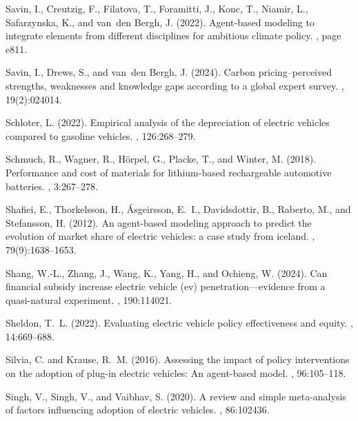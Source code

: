 \documentclass[12pt]{article}
\begin{document}
\begin{thebibliography}{}
Savin, I., Creutzig, F., Filatova, T., Foramitti, J., Konc, T., Niamir, L.,
  Safarzynska, K., and van~den Bergh, J. (2022).
\newblock Agent-based modeling to integrate elements from different disciplines
  for ambitious climate policy.
, page e811.

Savin, I., Drews, S., and van~den Bergh, J. (2024).
\newblock Carbon pricing--perceived strengths, weaknesses and knowledge gaps
  according to a global expert survey.
, 19(2):024014.

Schloter, L. (2022).
\newblock Empirical analysis of the depreciation of electric vehicles compared
  to gasoline vehicles.
, 126:268--279.

Schmuch, R., Wagner, R., H\"{o}rpel, G., Placke, T., and Winter, M. (2018).
\newblock Performance and cost of materials for lithium-based rechargeable
  automotive batteries.
, 3:267--278.

Shafiei, E., Thorkelsson, H., Ásgeirsson, E.~I., Davidsdottir, B., Raberto,
  M., and Stefansson, H. (2012).
\newblock An agent-based modeling approach to predict the evolution of market
  share of electric vehicles: a case study from iceland.
, 79(9):1638--1653.

Shang, W.-L., Zhang, J., Wang, K., Yang, H., and Ochieng, W. (2024).
\newblock Can financial subsidy increase electric vehicle (ev)
  penetration---evidence from a quasi-natural experiment.
, 190:114021.

Sheldon, T.~L. (2022).
\newblock Evaluating electric vehicle policy effectiveness and equity.
, 14:669--688.

Silvia, C. and Krause, R.~M. (2016).
\newblock Assessing the impact of policy interventions on the adoption of
  plug-in electric vehicles: An agent-based model.
, 96:105--118.

Singh, V., Singh, V., and Vaibhav, S. (2020).
\newblock A review and simple meta-analysis of factors influencing adoption of
  electric vehicles.
,
  86:102436.


\end{thebibliography}
\end{document}
